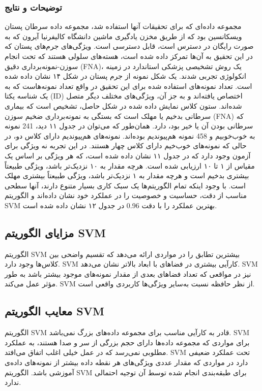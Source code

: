 \documentclass{CSICC2020}
\begin{document}
\subsubsection{توضیحات و نتایج}
مجموعه داده‌ای که برای تحقیقات آنها استفاده شد، مجموعه داده سرطان پستان ویسکانسین بود که از طریق مخزن یادگیری ماشین دانشگاه کالیفرنیا آیرون که به صورت رایگان در دسترس است، قابل دسترسی است. ویژگی‌های جرم‌های پستان که در این تحقیق به آن‌ها تمرکز داده شده است، هسته‌های سلولی هستند که تحت انجام سوزن-نمونه‌برداری دقیق (FNA)، یک روش تشخیصی پزشکی استاندارد در زمینه انکولوژی تجربی شدند. یک شکل نمونه از جرم پستان در شکل ۱۴ نشان داده شده است. 
تعداد نمونه‌های استفاده شده برای این تحقیق در واقع تعداد نمونه‌هاست که به یک شناسه یکتا (ID) اختصاص یافته‌اند و به جز آن، ویژگی‌های مختلف دیگر متصل شده‌اند. ستون کلاس نمایش داده ‌شده در شکل حاصل، تشخیص است که بیماری سرطانی بدخیم یا مهلک است که بستگی به نمونه‌برداری ضخیم سوزن (FNA) که سرطانی بودن آن یا خیر بود، دارد. همان‌طور که می‌توان در جدول ۱۱ دید، 241 نمونه به خوب‌خوبیم و 458 نمونه هم‌پیوندیم بوده‌اند. نمونه‌های هم‌پیوندیم دارای کلاس دو، در حالی که نمونه‌های خوب‌خیم دارای کلاس چهار هستند. 
در این تجربه نه ویژگی برای آزمون وجود دارد که در جدول ۱۱ نشان داده شده است، که هر ویژگی بر اساس یک مقیاس از ۱ تا ۱۰ ارزیابی شده است. هرچه مقدار به ۱۰ نزدیک‌تر باشد، ویژگی طبیعتاً بیشتری بدخیم است و هرچه مقدار به ۱ نزدیک‌تر باشد، ویژگی طبیعتاً بیشتری مهلک است. با وجود اینکه تمام الگوریتم‌ها یک سبک کاری بسیار متنوع دارند، آنها سطحی مناسب از دقت، حساسیت و خصوصیت را در عملکرد خود نشان داده‌اند و الگوریتم SVM بهترین عملکرد را با دقت 0.96 در جدول ۱۲ نشان داده شده است. 

\subsection{مزایای الگوریتم SVM}
 الگوریتم SVM بیشترین تطابق را در مواردی ارائه می‌دهد که تقسیم واضحی بین کلاس‌ها وجود دارد. 
 SVM کارآیی بیشتری در فضاهای با ابعاد بالاتر نشان می‌دهد. 
 SVM نیز در مواقعی که تعداد فضاهای بعدی از مقدار نمونه‌های موجود بیشتر باشد به طور مؤثر عمل می‌کند. 
 SVM از نظر حافظه نسبت به‌سایر ویژگی‌ها کاربردی واقعی است. 

\subsection{معایب الگوریتم SVM}
 الگوریتم SVM قادر به کارآیی مناسب برای مجموعه داده‌های بزرگ نمی‌باشد. 
 SVM برای مواردی که مجموعه داده‌ها دارای حجم بزرگی از سر و صدا هستند، به عملکرد مطلوبی نمی‌رسد که در عمل خیلی اغلب اتفاق می‌افتد. 
 SVM تحت عملکرد ضعیفی دارد در مواردی که مقدار عددی ویژگی‌های هر نقطه داده بیشتر از نمونه‌های داده‌ی آموزشی باشد. 
 الگوریتم SVM برای طبقه‌بندی انجام شده توسط آن توجیه احتمالی ندارد. 
\end{document}
